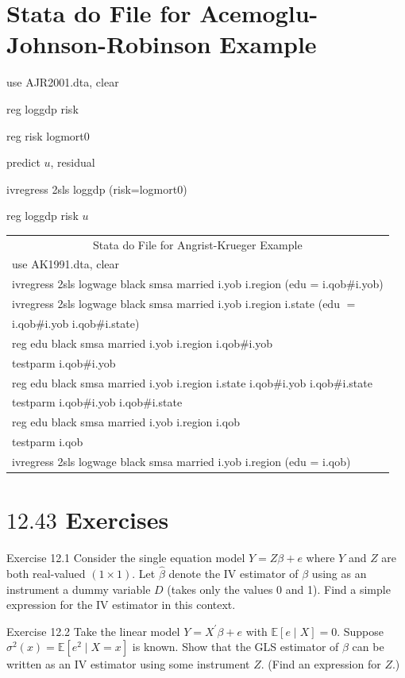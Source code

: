 \documentclass[10pt]{article}
\begin{document}
\section{Stata do File for Acemoglu-Johnson-Robinson Example}
use AJR2001.dta, clear

reg loggdp risk

reg risk logmort0

predict $u$, residual

ivregress 2sls loggdp (risk=logmort0)

reg loggdp risk $u$

\begin{tabular}{l}
\multicolumn{1}{|c|}{Stata do File for Angrist-Krueger Example} \\
use AK1991.dta, clear \\
ivregress 2sls logwage black smsa married i.yob i.region (edu = i.qob\#i.yob) \\
ivregress 2sls logwage black smsa married i.yob i.region i.state (edu $=$ \\
i.qob\#i.yob i.qob\#i.state) \\
reg edu black smsa married i.yob i.region i.qob\#i.yob \\
testparm i.qob\#i.yob \\
reg edu black smsa married i.yob i.region i.state i.qob\#i.yob i.qob\#i.state \\
testparm i.qob\#i.yob i.qob\#i.state \\
reg edu black smsa married i.yob i.region i.qob \\
testparm i.qob \\
ivregress 2sls logwage black smsa married i.yob i.region (edu = i.qob) \\
\end{tabular}

\section{$12.43$ Exercises}
Exercise 12.1 Consider the single equation model $Y=Z \beta+e$ where $Y$ and $Z$ are both real-valued $(1 \times 1)$. Let $\widehat{\beta}$ denote the IV estimator of $\beta$ using as an instrument a dummy variable $D$ (takes only the values 0 and 1). Find a simple expression for the IV estimator in this context.

Exercise 12.2 Take the linear model $Y=X^{\prime} \beta+e$ with $\mathbb{E}[e \mid X]=0$. Suppose $\sigma^{2}(x)=\mathbb{E}\left[e^{2} \mid X=x\right]$ is known. Show that the GLS estimator of $\beta$ can be written as an IV estimator using some instrument $Z$. (Find an expression for $Z$.)
\end{document}
